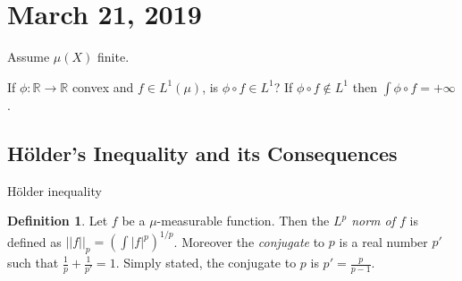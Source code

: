 \documentclass{article}
\theoremstyle{definition}
\newtheorem{definition}[theorem]{Definition}
\begin{document}










\section{March 21, 2019}

Assume $\mu(X)$ finite.


If $\phi:\mathbb{R}\rightarrow\mathbb{R}$ convex and $f\in L^1(\mu)$, is $\phi\circ f\in L^1$? If $\phi\circ f\notin L^1$ then $\int \phi\circ f=+\infty$.


\subsection{H\"older's Inequality and its Consequences}

H\"older inequality

\begin{definition}
    Let $f$ be a $\mu$-measurable function. Then the \textit{$L^p$ norm of $f$} is defined as
    $||f||_p=\left(\int |f|^p\right)^{1/p}$. Moreover the \textit{conjugate} to $p$ is a real number
    $p'$ such that $\frac{1}{p}+\frac{1}{p'}=1$. Simply stated, the conjugate to $p$ is $p'=\frac{p}{p-1}$.
\end{definition}
\end{document}
